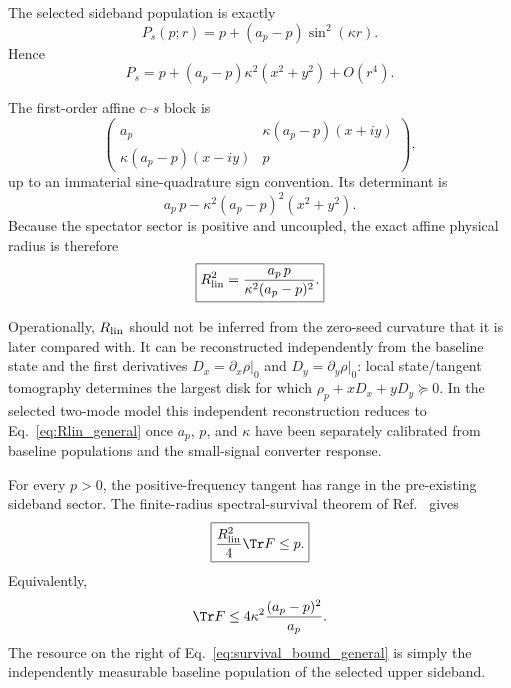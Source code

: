 The selected sideband population is exactly
\begin{equation}
\boxed{
P_s(p;r)=p+(a_p-p)\sin^2(\kappa r).}
\label{eq:sideband_population_general}
\end{equation}
Hence
\begin{equation}
P_s=p+(a_p-p)\kappa^2(x^2+y^2)+O(r^4).
\end{equation}

The first-order affine $c$--$s$ block is
\begin{equation}
\begin{pmatrix}
a_p & \kappa(a_p-p)(x+iy)\\
\kappa(a_p-p)(x-iy) & p
\end{pmatrix},
\end{equation}
up to an immaterial sine-quadrature sign convention. Its determinant is
\begin{equation}
a_p\,p-\kappa^2(a_p-p)^2(x^2+y^2).
\end{equation}
Because the spectator sector is positive and uncoupled, the exact affine physical radius is therefore
\begin{equation}
\boxed{
R_{\rm lin}^2=
\frac{a_p\,p}{\kappa^2(a_p-p)^2}.}
\label{eq:Rlin_general}
\end{equation}

Operationally, $R_{\rm lin}$ should not be inferred from the zero-seed curvature that it is later compared with. It can be reconstructed independently from the baseline state and the first derivatives $D_x=\partial_x\rho|_0$ and $D_y=\partial_y\rho|_0$: local state/tangent tomography determines the largest disk for which $\rho_p+xD_x+yD_y\succeq0$. In the selected two-mode model this independent reconstruction reduces to Eq.~\eqref{eq:Rlin_general} once $a_p$, $p$, and $\kappa$ have been separately calibrated from baseline populations and the small-signal converter response.

For every $p>0$, the positive-frequency tangent has range in the pre-existing sideband sector. The finite-radius spectral-survival theorem of Ref.~\cite{CompanionTwoRegimes2026} gives
\begin{equation}
\boxed{
\frac{R_{\rm lin}^2}{4}\Tr F\le p.}
\label{eq:survival_bound_general}
\end{equation}
Equivalently,
\begin{equation}
\Tr F\le
4\kappa^2\frac{(a_p-p)^2}{a_p}.
\label{eq:survival_ceiling_general}
\end{equation}
The resource on the right of Eq.~\eqref{eq:survival_bound_general} is simply the independently measurable baseline population of the selected upper sideband.

